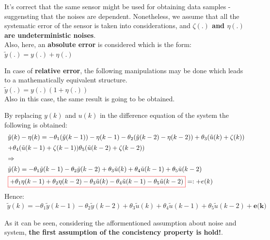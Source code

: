 \begin{factbox}
It's correct that the same sensor might be used for obtaining data samples - suggensting that the noises are dependent. Nonetheless, we assume that all the systematic error of the sensor is taken into considerations, and \textbf{\(\zeta(.)\) and \(\eta(.)\) are undeterministic noises}.\\

Also, here, an \textbf{absolute error} is considered which is the form:\\
\(\tilde{y}(.) = y(.) + \eta(.)\)
\end{factbox}
\newpage
\begin{factbox}
In case of \textbf{relative error}, the following manipulations may be done which leads to a mathematically equivalent structure.\\
\(\tilde{y}(.) = y(.)(1 + \eta(.))\)\\
Also in this case, the same result is going to be obtained.
\end{factbox}
By replacing \(y(k)\) and \(u(k)\) in the difference equation of the system the following is obtained:
\[
\begin{array}{l}
\tilde{y}(k) - \eta(k) = -\theta_1(\tilde{y}(k-1)) - \eta(k-1) -\theta_2(\tilde{y}(k-2) - \eta(k-2)) + \theta_3(\tilde{u}(k) + \zeta(k)) \\[1ex] 
+ \theta_4(\tilde{u}(k-1) + \zeta(k-1))
 \theta_5(\tilde{u}(k-2) + \zeta(k-2)) \\[1ex] 
\Rightarrow \\[1ex]
\tilde{y}(k)= -\theta_1 \tilde{y}(k - 1) - \theta_2 \tilde{y}(k - 2) + \theta_3 \tilde{u}(k) + \theta_4 \tilde{u}(k - 1) + \theta_5 \tilde{u}(k - 2) \\[1ex]
\textcolor{red}{\fbox{\textcolor{black}{$+ \theta_1\eta(k-1) + \theta_2\eta(k-2) - \theta_3\tilde{u}(k) - \theta_4\tilde{u}(k-1) - \theta_5\tilde{u}(k-2) $}}} =: + e(k) \\
\end{array}
\]
Hence:
\begin{equation}
\begin{array}{l}
\tilde{y}(k)= -\theta_1 \tilde{y}(k - 1) - \theta_2 \tilde{y}(k - 2) + \theta_3 \tilde{u}(k) + \theta_4 \tilde{u}(k - 1) + \theta_5 \tilde{u}(k - 2) + \textbf{e(k)}
\end{array}
\end{equation}

As it can be seen, considering the afformentioned assumption about noise and system, \textbf{the first assumption of the concistency property is hold!}.\\

